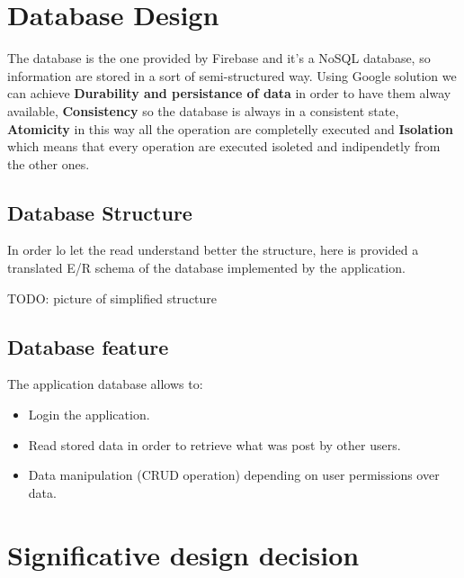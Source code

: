 \section{Database Design}
	The database is the one provided by Firebase and it's a NoSQL database, so information are stored in a sort of semi-structured way.
	Using Google solution we can achieve \textbf{Durability and persistance of data} in order to have them alway available, 
	\textbf{Consistency} so the database is always in a consistent state, \textbf{Atomicity} in this way all the operation are completelly executed and 
	\textbf{Isolation} which means that every operation are executed isoleted and indipendetly from the other ones.
	
	\subsection{Database Structure}
	In order lo let the read understand better the structure, here is provided a translated E/R schema of the database implemented by the application.
	
	TODO: picture of simplified structure 

	\subsection{Database feature}
	The application database allows to:
	
	\begin{itemize}
		\item Login the application.
		\item Read stored data in order to retrieve what was post by other users.
		\item Data manipulation (CRUD operation) depending on user permissions over data.
	\end{itemize}
	
	
\section{Significative design decision}